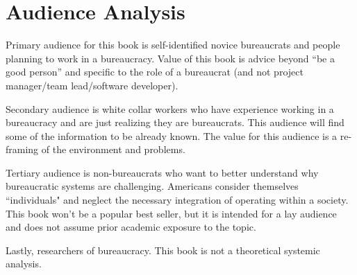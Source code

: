 \section{Audience Analysis}

Primary audience for this book is self-identified novice bureaucrats and people planning to work in a bureaucracy. Value of this book is advice beyond ``be a good person'' and specific to the role of a bureaucrat (and not project manager/team lead/software developer). 

Secondary audience is white collar workers who have experience working in a bureaucracy and are just realizing they are bureaucrats. This audience will find some of the information to be already known.  The value for this audience is a re-framing of the environment and problems. 

Tertiary audience is non-bureaucrats who want to better understand why bureaucratic systems are challenging. Americans consider themselves ``individuals" and neglect the necessary integration of operating within a society. This book won't be a popular best seller, but it is intended for a lay audience and does not assume prior academic exposure to the topic.

Lastly, researchers of bureaucracy. This book is not a theoretical systemic analysis. 